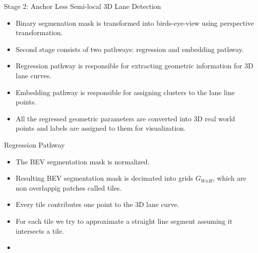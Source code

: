 \documentclass[aspectratio=169]{beamer}
\begin{document}
\begin{frame}{Stage 2: Anchor Less Semi-local 3D Lane Detection}
\begin{itemize}
    \item Binary segmenation mask is transformed into birds-eye-view using perspective transformation.
    \item Second stage consists of two pathways: regression and embedding pathway.
    \item Regression pathway is responsible for extracting geometric information for 3D lane curves.
    \item Embedding pathway is responsible for assigning clusters to the lane line points.
    \item All the regressed geometric parameters are converted into 3D real world points and labels are assigned to them for visualization.
\end{itemize}
\end{frame}

\begin{frame}{Regression Pathway}    
    \begin{itemize}
        \item The BEV segmentation mask is normalized.
        \item Resulting BEV segmentation mask is decimated into grids $G_{WxH}$, which are non overlappig patches called tiles. 
        \item Every tile contributes one point to the 3D lane curve.
        \item For each tile we try to approximate a straight line segment assuming it intersects a tile.
        \item 
    \end{itemize}
    
\end{frame}
\end{document}
